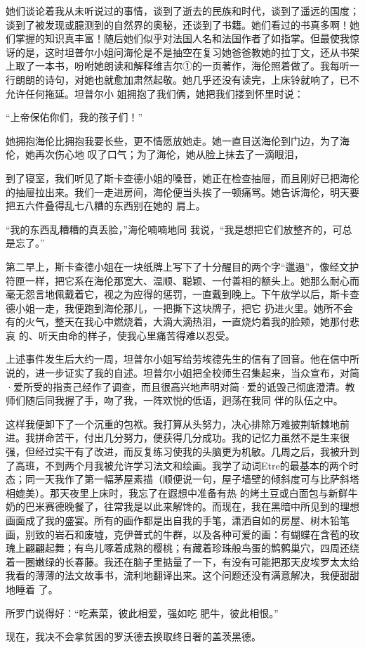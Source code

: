 \documentclass{article}
\begin{document}
她们谈论着我从未听说过的事情，谈到了逝去的民族和时代，谈到了遥远的国度；谈到了被发现或臆测到的自然界的奥秘，还谈到了书籍。她们看过的书真多啊！她们掌握的知识真丰富！随后她们似乎对法国人名和法国作者了如指掌。但最使我惊讶的是，这时坦普尔小姐问海伦是不是抽空在复习她爸爸教她的拉丁文，还从书架上取了一本书，吩咐她朗读和解释维吉尔①的一页著作，海伦照着做了。我每听一行朗朗的诗句，对她也就愈加肃然起敬。她几乎还没有读完，上床铃就响了，已不允许任何拖延。坦普尔小
姐拥抱了我们俩，她把我们搂到怀里时说： 

\newpage


“上帝保佑你们，我的孩子们！” 

她拥抱海伦比拥抱我要长些，更不情愿放她走。她一直目送海伦到门边，为了海伦，她再次伤心地
叹了口气；为了海伦，她从脸上抹去了一滴眼泪， 

到了寝室，我们听见了斯卡查德小姐的嗓音，她正在检查抽屉，而且刚好已把海伦的抽屉拉出来。我们一走进房间，海伦便当头挨了一顿痛骂。她告诉海伦，明天要把五六件叠得乱七八糟的东西别在她的
肩上。 

“我的东西乱糟糟的真丢脸，”海伦喃喃地同
我说，“我是想把它们放整齐的，可总是忘了。” 

第二早上，斯卡查德小姐在一块纸牌上写下了十分醒目的两个字“邋遢”，像经文护符匣一样，把它系在海伦那宽大、温顺、聪颖、一付善相的额头上。她那么耐心而毫无怨言地佩戴着它，视之为应得的惩罚，一直戴到晚上。下午放学以后，斯卡查德小姐一走，我便跑到海伦那儿，一把撕下这块牌子，把它
\newpage
扔进火里。她所不会有的火气，整天在我心中燃烧着，大滴大滴热泪，一直烧灼着我的脸颊，她那付悲哀
的、听天由命的样子，使我心里痛苦得难以忍受。 

上述事件发生后大约一周，坦普尔小姐写给劳埃德先生的信有了回音。他在信中所说的，进一步证实了我的自述。坦普尔小姐把全校师生召集起来，当众宣布，对简·爱所受的指责己经作了调查，而且很高兴地声明对简·爱的诋毁己彻底澄清。教师们随后同我握了手，吻了我，一阵欢悦的低语，迥荡在我同
伴的队伍之中。 

这样我便卸下了一个沉重的包袱。我打算从头努力，决心排除万难披荆斩棘地前进。我拼命苦干，付出几分努力，便获得几分成功。我的记忆力虽然不是生来很强，但经过实干有了改进，而反复练习使我的头脑更为机敏。几周之后，我被升到了高班，不到两个月我被允许学习法文和绘画。我学了动词Etre的最基本的两个时态；同一天我作了第一幅茅屋素描（顺便说一句，屋子墙壁的倾斜度可与比萨斜塔相媲美）。那天夜里上床时，我忘了在遐想中准备有热
\newpage
的烤土豆或白面包与新鲜牛奶的巴米赛德晚餐了，往常我是以此来解馋的。而现在，我在黑暗中所见到的理想画面成了我的盛宴。所有的画作都是出自我的手笔，潇洒自如的房屋、树木铅笔画，别致的岩石和废墟，克伊普式的牛群，以及各种可爱的画：有蝴蝶在含苞的玫瑰上翩翩起舞；有鸟儿啄着成熟的樱桃；有藏着珍珠般鸟蛋的鹪鹩巢穴，四周还绕着一圈嫩绿的长春藤。我还在脑子里掂量了一下，有没有可能把那天皮埃罗太太给我看的薄薄的法文故事书，流利地翻译出来。这个问题还没有满意解决，我便甜甜地睡着
了。 

所罗门说得好：“吃素菜，彼此相爱，强如吃
肥牛，彼此相恨。” 

现在，我决不会拿贫困的罗沃德去换取终日奢的盖茨黑德。
\end{document}
